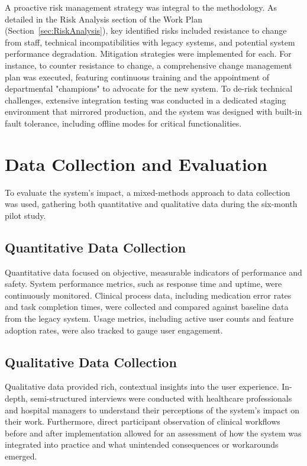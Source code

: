 A proactive risk management strategy was integral to the methodology. As detailed in the Risk Analysis section of the Work Plan (Section~\ref{sec:RiskAnalysis}), key identified risks included resistance to change from staff, technical incompatibilities with legacy systems, and potential system performance degradation. Mitigation strategies were implemented for each. For instance, to counter resistance to change, a comprehensive change management plan was executed, featuring continuous training and the appointment of departmental "champions" to advocate for the new system. To de-risk technical challenges, extensive integration testing was conducted in a dedicated staging environment that mirrored production, and the system was designed with built-in fault tolerance, including offline modes for critical functionalities.

\section{Data Collection and Evaluation}

To evaluate the system's impact, a mixed-methods approach to data collection was used, gathering both quantitative and qualitative data during the six-month pilot study.

\subsection{Quantitative Data Collection}
Quantitative data focused on objective, measurable indicators of performance and safety. System performance metrics, such as response time and uptime, were continuously monitored. Clinical process data, including medication error rates and task completion times, were collected and compared against baseline data from the legacy system. Usage metrics, including active user counts and feature adoption rates, were also tracked to gauge user engagement.

\subsection{Qualitative Data Collection}
Qualitative data provided rich, contextual insights into the user experience. In-depth, semi-structured interviews were conducted with healthcare professionals and hospital managers to understand their perceptions of the system's impact on their work. Furthermore, direct participant observation of clinical workflows before and after implementation allowed for an assessment of how the system was integrated into practice and what unintended consequences or workarounds emerged.

